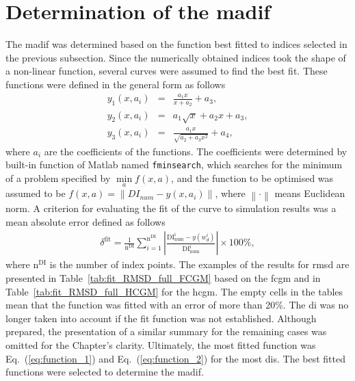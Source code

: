 \section{Determination of the \acl{madif}}
\label{sec:determination}

The \ac{madif} was determined based on the function best fitted to indices selected in the previous subsection.
Since the numerically obtained indices took the shape of a non-linear function, several curves were assumed to find the best fit.
These functions were defined in the general form as follows
\begin{eqnarray}
	y_1(x,a_i) & = & \frac{a_1x}{x+a_2}+a_3,
	\label{eq:function_1}\\
	y_2(x,a_i) & = & a_1\sqrt{x} + a_2x+a_3,
	\label{eq:function_2}\\
	y_3(x,a_i) & = & \frac{a_1x}{\sqrt{a_2 + a_3x^2}}+a_4,\label{eq:function_3} 
\end{eqnarray}
where \(a_i\) are the coefficients of the functions.
The coefficients were determined by built-in function of Matlab named \verb+fminsearch+, which searches for the minimum of a problem specified by \(\min\limits_a f(x,a)\), and the function to be optimised was assumed to be \(f(x,a)=\left\|DI_{num} - y(x,a_i)\right\|\), where \(\left\|\cdot\right\|\) means Euclidean norm.
A criterion for evaluating the fit of the curve to simulation results was a mean absolute error defined as follows
\begin{eqnarray}
	\delta^{\mathrm{fit}} = \frac{1}{\mathrm{n^{DI}}}\sum_{i=1}^{\mathrm{n^{DI}}} \left|\frac{\mathrm{DI^i_{num}}-y(w_d^i)}{\mathrm{DI^i_{num}}}\right|\times100\%,
\end{eqnarray}
where \(\mathrm{n^{DI}}\) is the number of index points.
The examples of the results for \ac{rmsd} are presented in Table~\ref{tab:fit_RMSD_full_FCGM} based on the \ac{fcgm} and in Table~\ref{tab:fit_RMSD_full_HCGM} for the \ac{hcgm}.
The empty cells in the tables mean that the function was fitted with an error of more than 20\%.
The \ac{di} was no longer taken into account if the fit function was not established.
Although prepared, the presentation of a similar summary for the remaining cases was omitted for the Chapter's clarity.
Ultimately, the most fitted function was Eq.~(\ref{eq:function_1}) and Eq.~(\ref{eq:function_2}) for the most \acp{di}.
The best fitted functions were selected to determine the \ac{madif}.

